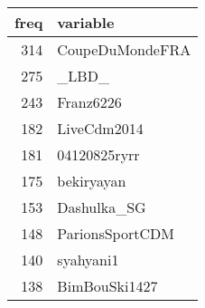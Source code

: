 \begin{table}[ht]
\centering
\begin{tabular}{rl}
  \hline
freq & variable \\ 
  \hline
314 & CoupeDuMondeFRA \\ 
  275 & \_LBD\_ \\ 
  243 & Franz6226 \\ 
  182 & LiveCdm2014 \\ 
  181 & 04120825ryrr \\ 
  175 & bekiryayan \\ 
  153 & Dashulka\_SG \\ 
  148 & ParionsSportCDM \\ 
  140 & syahyani1 \\ 
  138 & BimBouSki1427 \\ 
   \hline
\end{tabular}
\end{table}
